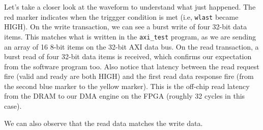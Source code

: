 \documentclass[11pt]{article}
\begin{document}
\begin{appendices}
\begin{center}
\end{center}

Let's take a closer look at the waveform to understand what just happened. The red marker indicates when the triggger condition is met (i.e, \verb|wlast| became HIGH). On the write transaction, we can see a burst write of four 32-bit data items. This matches what is written in the \verb|axi_test| program, as we are sending an array of 16 8-bit items on the 32-bit AXI data bus. On the read transaction, a burst read of four 32-bit data items is received, which confirms our expectation from the software program too. Also notice that latency between the read request fire (valid and ready are both HIGH) and the first read data response fire (from the second blue marker to the yellow marker). This is the off-chip read latency from the DRAM to our DMA engine on the FPGA (roughly 32 cycles in this case).

\begin{center}
\end{center}

We can also observe that the read data matches the write data.

\begin{center}
\end{center}


\end{appendices}
\end{document}
